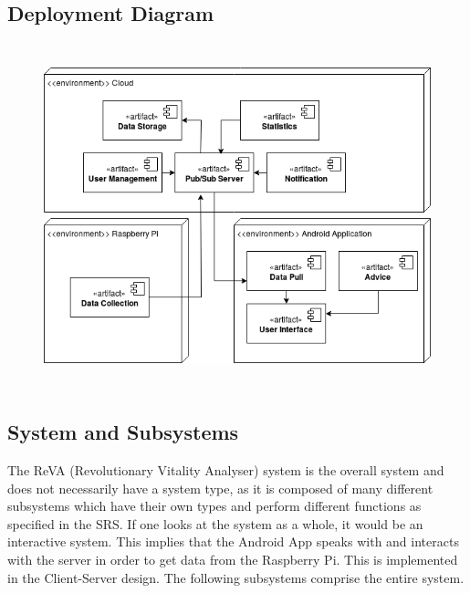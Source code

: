 \subsection{Deployment Diagram}
\begin{center}
\begin{figure}[h]
	\includegraphics[width=15cm, height=10cm]{OverallDescription/DeploymentDiagram.png}
\end{figure}
\end{center}

\subsection{System and Subsystems}
	The ReVA (Revolutionary Vitality Analyser) system is the overall system and does not necessarily have a system type, as it is composed of many different subsystems which have their own types and perform different functions as specified in the SRS. If one looks at the system as a whole, it would be an interactive system. This implies that the Android App speaks with and interacts with the server in order to get data from the Raspberry Pi. This is implemented in the Client-Server design. The following subsystems comprise the entire system.

